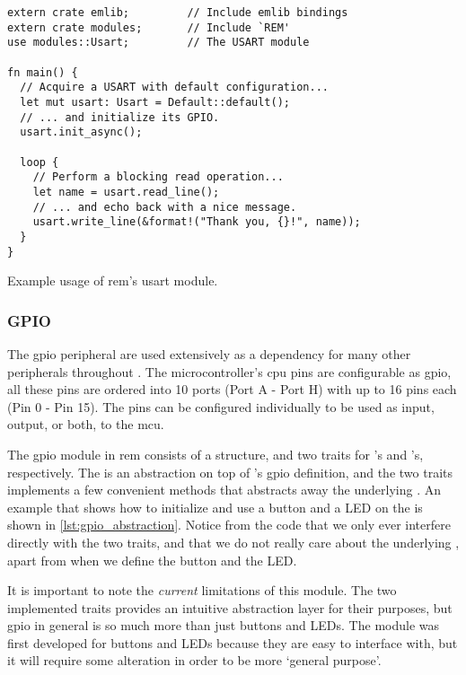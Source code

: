 \begin{listing}[H]
  \begin{verbatim}
extern crate emlib;         // Include emlib bindings
extern crate modules;       // Include `REM'
use modules::Usart;         // The USART module

fn main() {
  // Acquire a USART with default configuration...
  let mut usart: Usart = Default::default();
  // ... and initialize its GPIO.
  usart.init_async();

  loop {
    // Perform a blocking read operation...
    let name = usart.read_line();
    // ... and echo back with a nice message.
    usart.write_line(&format!("Thank you, {}!", name));
  }
}
  \end{verbatim}
  \caption{Example usage of \gls{rem}'s \gls{usart} module.}
  \label{lst:usart_abstraction}
\end{listing}

\subsubsection{GPIO} %
\label{ssub:gpio}

The \gls{gpio} peripheral are used extensively as a dependency for many other peripherals throughout {\emlib}.
The microcontroller's \gls{cpu} pins are configurable as \gls{gpio}, all these pins are ordered into 10 ports (Port A - Port H) with up to 16 pins each (Pin 0 - Pin 15).
The pins can be configured individually to be used as input, output, or both, to the \gls{mcu}.

The \gls{gpio} module in \gls{rem} consists of a  structure, and two traits for 's and 's, respectively.
The  is an abstraction on top of {\emlib}'s \gls{gpio} definition, and the two traits implements a few convenient methods that abstracts away the underlying .
An example that shows how to initialize and use a button and a LED on the {\STK} is shown in \autoref{lst:gpio_abstraction}.
Notice from the code that we only ever interfere directly with the two traits, and that we do not really care about the underlying , apart from when we define the button and the LED.

It is important to note the \emph{current} limitations of this module.
The two implemented traits provides an intuitive abstraction layer for their purposes, but \gls{gpio} in general is so much more than just buttons and LEDs.
The module was first developed for buttons and LEDs because they are easy to interface with, but it will require some alteration in order to be more `general purpose'.

